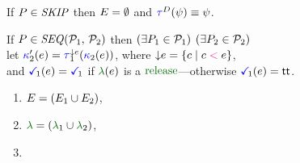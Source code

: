 \begin{figure}
  \raggedright
  
  \noindent
  If $P\in\textnormal{\textit{SKIP}}$ then $E = \emptyset$ and
  $\aTr{\bEvs}{\bForm} \riff \bForm$.
  \medskip

  \noindent
  If $\aPS \in \sSEMI{\aPSS_1}{\aPSS_2}$ then $(\exists P_1\in\mathcal{P}_1)$ $(\exists P_2\in\mathcal{P}_2)$\\
  let
  $\labelingForm'_2(\aEv)=\aTr[1]{\Cdown{\aEv}}{\labelingForm_2(\aEv})$, where
  $\smash{\downarrow}e=\{ c \mid c \mathrel{{\color{magenta}<}} e \}$,\\
  and
  $\aTerm[1](\aEv) = \aTerm[1]$ if $\labeling(\aEv)$ is a $\srelease$---otherwise
  $\aTerm[1](\aEv) = \TRUE$.
  \begin{multicols}{2}
    \begin{enumerate}[topsep=0pt,label=(\textsc{s}\arabic*),ref=\textsc{s}\arabic*]
    \item \label{seq-E}
      $E = (E_1\cup E_2)$,
    \item \label{seq-lambda}
      ${\labeling}=\PBR{{\labeling_1}\cup {\labeling_2}}$, 
    \item[] 

\end{enumerate}
\end{multicols}
\end{figure}
